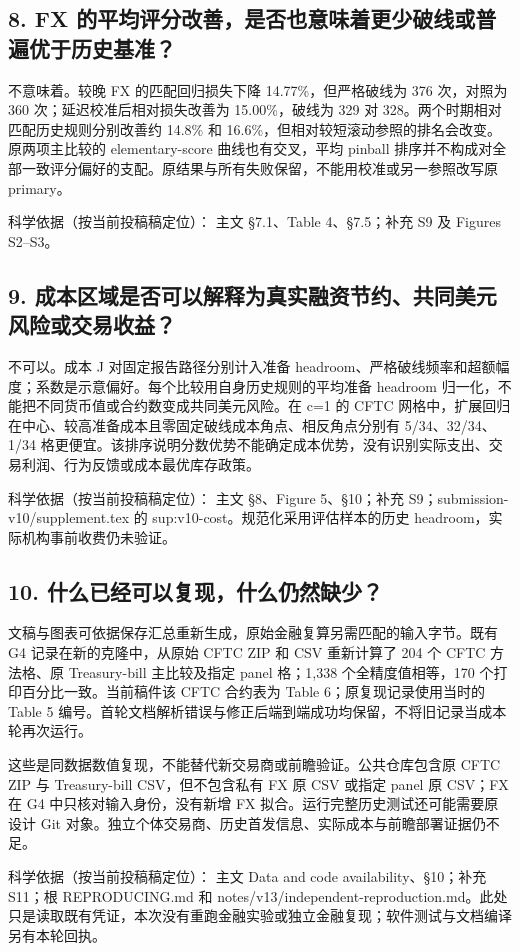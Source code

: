 \documentclass[11pt,a4paper]{article}
\begin{document}
\subsection*{8. FX 的平均评分改善，是否也意味着更少破线或普遍优于历史基准？}

不意味着。较晚 FX 的匹配回归损失下降 14.77\%，但严格破线为 376 次，对照为 360 次；延迟校准后相对损失改善为 15.00\%，破线为 329 对 328。两个时期相对匹配历史规则分别改善约 14.8\% 和 16.6\%，但相对较短滚动参照的排名会改变。原两项主比较的 elementary-score 曲线也有交叉，平均 pinball 排序并不构成对全部一致评分偏好的支配。原结果与所有失败保留，不能用校准或另一参照改写原 primary。

科学依据（按当前投稿稿定位）： 主文 §7.1、Table 4、§7.5；补充 S9 及 Figures S2--S3。

\subsection*{9. 成本区域是否可以解释为真实融资节约、共同美元风险或交易收益？}

不可以。成本 J 对固定报告路径分别计入准备 headroom、严格破线频率和超额幅度；系数是示意偏好。每个比较用自身历史规则的平均准备 headroom 归一化，不能把不同货币值或合约数变成共同美元风险。在 c=1 的 CFTC 网格中，扩展回归在中心、较高准备成本且零固定破线成本角点、相反角点分别有 5/34、32/34、1/34 格更便宜。该排序说明分数优势不能确定成本优势，没有识别实际支出、交易利润、行为反馈或成本最优库存政策。

科学依据（按当前投稿稿定位）： 主文 §8、Figure 5、§10；补充 S9；submission-v10/supplement.tex 的 sup:v10-cost。规范化采用评估样本的历史 headroom，实际机构事前收费仍未验证。

\subsection*{10. 什么已经可以复现，什么仍然缺少？}

文稿与图表可依据保存汇总重新生成，原始金融复算另需匹配的输入字节。既有 G4 记录在新的克隆中，从原始 CFTC ZIP 和 CSV 重新计算了 204 个 CFTC 方法格、原 Treasury-bill 主比较及指定 panel 格；1,338 个全精度值相等，170 个打印百分比一致。当前稿件该 CFTC 合约表为 Table 6；原复现记录使用当时的 Table 5 编号。首轮文档解析错误与修正后端到端成功均保留，不将旧记录当成本轮再次运行。

这些是同数据数值复现，不能替代新交易商或前瞻验证。公共仓库包含原 CFTC ZIP 与 Treasury-bill CSV，但不包含私有 FX 原 CSV 或指定 panel 原 CSV；FX 在 G4 中只核对输入身份，没有新增 FX 拟合。运行完整历史测试还可能需要原设计 Git 对象。独立个体交易商、历史首发信息、实际成本与前瞻部署证据仍不足。

科学依据（按当前投稿稿定位）： 主文 Data and code availability、§10；补充 S11；根 REPRODUCING.md 和 notes/v13/independent-reproduction.md。此处只是读取既有凭证，本次没有重跑金融实验或独立金融复现；软件测试与文档编译另有本轮回执。
\end{document}

